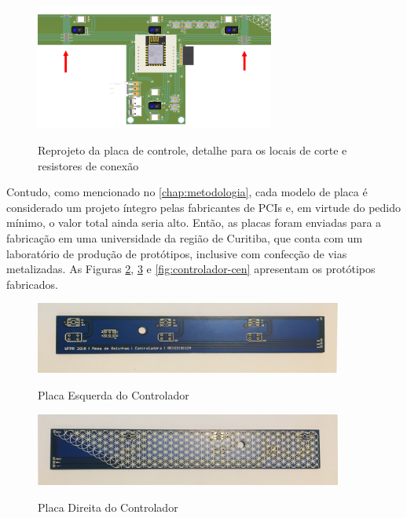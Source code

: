 \begin{figure}[H]
    \centering
    \caption{Reprojeto da placa de controle, detalhe para os locais de corte e resistores de conexão}
    \includegraphics[width=0.7\textwidth]{./dados/figuras/controlador-corte}
    \label{fig:controlador-corte}
\end{figure}

Contudo, como mencionado no \autoref{chap:metodologia}, cada modelo de placa é considerado um projeto íntegro pelas fabricantes de PCIs e, em virtude do pedido mínimo, o valor total ainda seria alto. Então, as placas foram enviadas para a fabricação em uma universidade da região de Curitiba, que conta com um laboratório de produção de protótipos, inclusive com confecção de vias metalizadas. As Figuras \ref{fig:controlador-esq}, \ref{fig:controlador-dir} e \ref{fig:controlador-cen} apresentam os protótipos fabricados.

\begin{figure}[H]
    \centering
    \caption{Placa Esquerda do Controlador}
    \includegraphics[width=0.9\textwidth]{./dados/figuras/controlador-esq}
    \label{fig:controlador-esq}
\end{figure}

\begin{figure}[H]
    \centering
    \caption{Placa Direita do Controlador}
    \includegraphics[width=0.9\textwidth]{./dados/figuras/controlador-dir}
    \label{fig:controlador-dir}
\end{figure}

